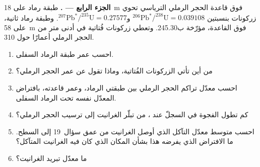 \begin{problem}
\noindent\textbf{الجزء الرابع --- .} طبقة رماد على \qty{18}{m} فوق قاعدة الحجر الرملي الترياسي تحوي زركونات بنسبتين $^{206}\mathrm{Pb}^*/^{238}\mathrm{U} = 0.039108$ و$^{207}\mathrm{Pb}^*/^{235}\mathrm{U} = 0.27577$. وطبقة رماد ثانية، على \qty{58}{m} فوق القاعدة، مؤرّخة ب\qty{245.30}{\Ma}. وتعطي زركونات فُتاتية في أدنى متر من الحجر الرملي أعمارًا حول \qty{310}{\Ma}.
\begin{enumerate}[resume]
  \item احسب عمر طبقة الرماد السفلى.
  \item من أين تأتي الزركونات الفُتاتية، وماذا تقول عن عمر الحجر الرملي؟
  \item احسب معدّل تراكم الحجر الرملي بين طبقتي الرماد، وعمر قاعدته، بافتراض المعدّل نفسه تحت الرماد السفلى.
  \item كم تطول الفجوة في السجلّ عند ، من تبلّر الغرانيت إلى ترسيب الحجر الرملي؟
  \item احسب متوسط معدّل التآكل الذي أوصل الغرانيت من عمق سؤال~19 إلى السطح. ما الافتراض الذي يفرضه هذا بشأن المكان الذي كان فيه الغرانيت المتآكل؟
  \item ما معدّل تبريد الغرانيت؟
\end{enumerate}
\end{problem}
